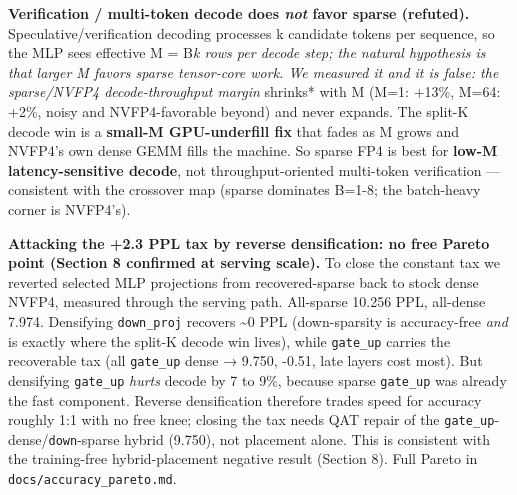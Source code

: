 \documentclass[
]{article}
\begin{document}
\textbf{Verification / multi-token decode does \emph{not} favor sparse
(refuted).} Speculative/verification decoding processes k candidate
tokens per sequence, so the MLP sees effective M = B\emph{k rows per
decode step; the natural hypothesis is that larger M favors sparse
tensor-core work. We measured it and it is false: the sparse/NVFP4
decode-throughput margin }shrinks* with M (M=1: +13\%, M=64: +2\%, noisy
and NVFP4-favorable beyond) and never expands. The split-K decode win is
a \textbf{small-M GPU-underfill fix} that fades as M grows and NVFP4's
own dense GEMM fills the machine. So sparse FP4 is best for
\textbf{low-M latency-sensitive decode}, not throughput-oriented
multi-token verification --- consistent with the crossover map (sparse
dominates B=1-8; the batch-heavy corner is NVFP4's).

\textbf{Attacking the +2.3 PPL tax by reverse densification: no free
Pareto point (Section 8 confirmed at serving scale).} To close the
constant tax we reverted selected MLP projections from recovered-sparse
back to stock dense NVFP4, measured through the serving path. All-sparse
10.256 PPL, all-dense 7.974. Densifying \texttt{down\_proj} recovers
\textasciitilde0 PPL (down-sparsity is accuracy-free \emph{and} is
exactly where the split-K decode win lives), while \texttt{gate\_up}
carries the recoverable tax (all \texttt{gate\_up} dense → 9.750, -0.51,
late layers cost most). But densifying \texttt{gate\_up} \emph{hurts}
decode by 7 to 9\%, because sparse \texttt{gate\_up} was already the
fast component. Reverse densification therefore trades speed for
accuracy roughly 1:1 with no free knee; closing the tax needs QAT repair
of the \texttt{gate\_up}-dense/\texttt{down}-sparse hybrid (9.750), not
placement alone. This is consistent with the training-free
hybrid-placement negative result (Section 8). Full Pareto in
\texttt{docs/accuracy\_pareto.md}.
\end{document}
